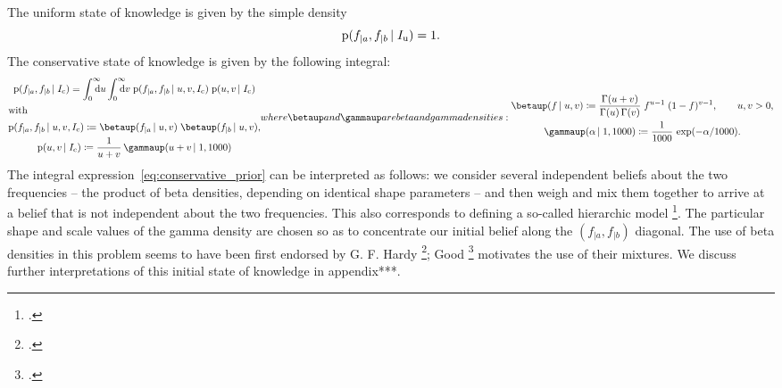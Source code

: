 \documentclass[\ifafour a4paper,12pt,\else a5paper,10pt,\fi%
onecolumn,oneside,article,%
british%
]{memoir}
\theoremstyle{remark}
\theoremstyle{innote}
\newcommand*{\citep}{\footcites}
\newcommand*{\citey}{\footcites}
\newcommand*{\di}{\mathrm{d}}%
\newcommand*{\defd}{\coloneqq}
\newcommand*{\pf}{\mathrm{p}}%
\renewcommand*{\|}[1][]{\nonscript\,#1\vert\nonscript\;\mathopen{}}
\newcommand*{\sect}{\S}%
\newcommand*{\yI}{I}
\newcommand*{\yIu}{\yI_\text{u}}
\newcommand*{\yIc}{\yI_\text{c}}
\newcommand*{\ya}{a}
\newcommand*{\yb}{b}
\newcommand*{\dbeta}{\betaup}
\newcommand*{\dgamma}{\gammaup}
\newcommand*{\yA}{\alpha}
\newcommand*{\yua}{u}
\newcommand*{\yub}{v}
\begin{document}
The uniform state of knowledge is given by the simple density
\begin{equation}
  \label{eq:uniform_prior}
  \pf(f_{|\ya}, f_{|\yb} \| \yIu)%
  =1.%
\end{equation}
The conservative state of knowledge is given by the following integral:
\begin{subequations}
  \label{eq:conservative_prior}
  \begin{gather}
    \pf(f_{|\ya}, f_{|\yb} \| \yIc)%
    =
    \int_{\mathrlap{0}}^{\mathrlap{\infty}}\di\yua
    \int_{\mathrlap{0}}^{\mathrlap{\infty}}\di\yub\;
    \pf(f_{|\ya}, f_{|\yb} \| \yua,\yub,\yIc)\;
    \pf(\yua,\yub \| \yIc)%
    \\
    \shortintertext{with}
    \label{eq:beta_product}
    \pf(f_{|\ya}, f_{|\yb} \| \yua,\yub,\yIc)\defd
    \dbeta(f_{|\ya} \| \yua,\yub)\;
    \dbeta(f_{|\yb} \| \yua,\yub),
    \\
    \label{eq:p_initial_parameters}
    \pf(\yua,\yub \| \yIc)\defd \frac{1}{u+v}\,\dgamma(u+v \| 1, 1000)
  \end{gather}
  where $\dbeta$ and $\dgamma$ are beta and gamma densities:
  \begin{gather}
    \label{eq:def_beta}
    \dbeta(f \| \yua,\yub) \defd
    \frac{\Gamma(\yua+\yub)}{\Gamma(\yua)\,\Gamma(\yub)}\;
    f^{\yua-1}\;(1-f)^{\yub-1},
    \qquad  \yua,\yub>0,
    \\
    \label{eq:def_gamma}
    \dgamma(\yA \| 1, 1000) \defd
    \frac{1}{1000}\,\exp(-\yA/1000).
  \end{gather}
\end{subequations}
The integral expression~\eqref{eq:conservative_prior} can be interpreted as
follows: we consider several independent beliefs about the two frequencies
-- the product of beta densities, depending on identical shape parameters
-- and then weigh and mix them together to arrive at a belief that is not
independent about the two frequencies. This also corresponds to defining a
so-called hierarchic model \citep{good1980}. The particular shape and scale
values of the gamma density are chosen so as to concentrate our initial
belief along the $(f_{|\ya}, f_{|\yb})$ diagonal. The use of beta densities
in this problem seems to have been first endorsed by G. F. Hardy
\citey{hardy1889}; Good \citey[\sect~4.1]{good1965}[\sect~4]{good1980}
motivates the use of their mixtures. We discuss further interpretations of
this initial state of knowledge in appendix***.
\end{document}

